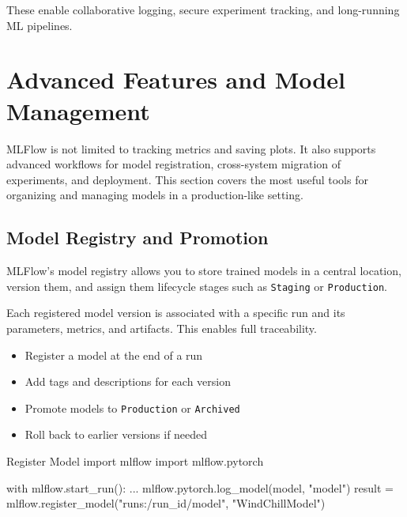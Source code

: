 These enable collaborative logging, secure experiment tracking, and long-running ML pipelines.



%
\section{Advanced Features and Model Management}

MLFlow is not limited to tracking metrics and saving plots. It also supports advanced workflows for model registration, cross-system migration of experiments, and deployment. This section covers the most useful tools for organizing and managing models in a production-like setting.

%
\subsection{Model Registry and Promotion}

MLFlow’s model registry allows you to store trained models in a central location, version them, and assign them lifecycle stages such as \texttt{Staging} or \texttt{Production}.

Each registered model version is associated with a specific run and its parameters, metrics, and artifacts. This enables full traceability.

\begin{itemize}
    \item Register a model at the end of a run
    \item Add tags and descriptions for each version
    \item Promote models to \texttt{Production} or \texttt{Archived}
    \item Roll back to earlier versions if needed
\end{itemize}

\begin{codeonly}{Register Model}
import mlflow
import mlflow.pytorch

with mlflow.start_run():
    ...
    mlflow.pytorch.log_model(model, "model")
    result = mlflow.register_model("runs:/{run_id}/model", "WindChillModel")
\end{codeonly}

